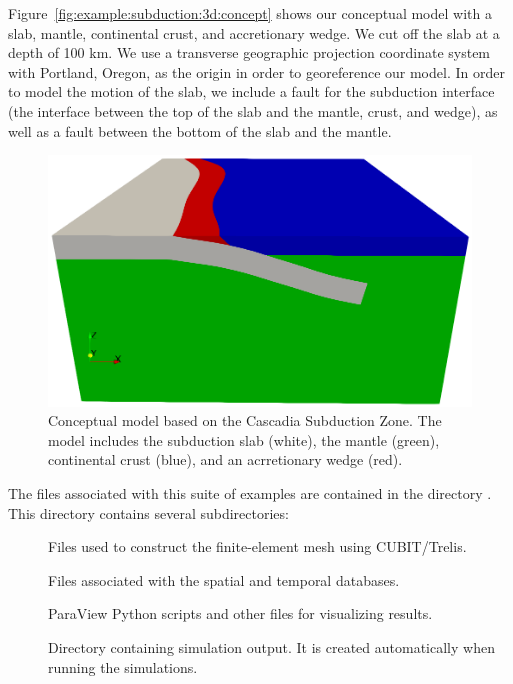 Figure~\vref{fig:example:subduction:3d:concept} shows our conceptual
model with a slab, mantle, continental crust, and accretionary
wedge. We cut off the slab at a depth of 100 km. We use a transverse
geographic projection coordinate system with Portland, Oregon, as the
origin in order to georeference our model. In order to model the
motion of the slab, we include a fault for the subduction interface
(the interface between the top of the slab and the mantle, crust, and
wedge), as well as a fault between the bottom of the slab and the
mantle.

\begin{figure}[htbp]
  \includegraphics[width=4.5in]{examples/figs/subduction3d_conceptualmodel}
  \caption{Conceptual model based on the Cascadia Subduction Zone. The
    model includes the subduction slab (white), the mantle (green),
    continental crust (blue), and an acrretionary wedge (red).}
  \label{fig:example:subduction:3d:concept}
\end{figure}

The files associated with this suite of examples are contained in the
directory . This directory contains
several subdirectories:
\begin{description}
\item[] Files used to construct the finite-element mesh using
  CUBIT/Trelis.
\item[] Files associated with the spatial
  and temporal databases.
\item[] ParaView
  Python scripts and other files for visualizing results.
\item[] Directory containing simulation
  output. It is created automatically when running the
  simulations.
\end{description}


